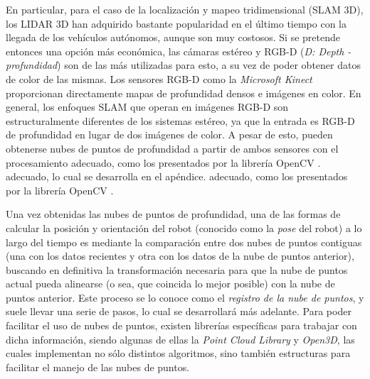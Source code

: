 \fi



En particular, para el caso de la localización y mapeo tridimensional (SLAM 3D), los LIDAR 3D han adquirido bastante popularidad en el último tiempo con la llegada de los vehículos autónomos, aunque son muy costosos. Si se pretende entonces una opción más económica, las cámaras estéreo y RGB-D (\textit{D: Depth - profundidad}) son de las más utilizadas para esto, a su vez de poder obtener datos de color de las mismas. Los sensores RGB-D como la \textit{Microsoft Kinect} proporcionan directamente mapas de profundidad densos e imágenes en color. En general, los enfoques SLAM que operan en imágenes RGB-D son estructuralmente diferentes de los sistemas estéreo, ya que la entrada es RGB-D de profundidad en lugar de dos imágenes de color. A pesar de esto, pueden obtenerse nubes de puntos de profundidad a partir de ambos sensores con el procesamiento
\ifimagenes
\ifimagenespaper
adecuado, como los presentados por la librería OpenCV \cite{kaehler2017}.
\else
adecuado, lo cual se desarrolla en el apéndice.
\fi
\else
adecuado, como los presentados por la librería OpenCV \cite{kaehler2017}.
\fi

Una vez obtenidas las nubes de puntos de profundidad, una de las formas de calcular la posición y orientación del robot (conocido como la \textit{pose} del robot) a lo largo del tiempo es mediante la comparación entre dos nubes de puntos contiguas (una con los datos recientes y otra con los datos de la nube de puntos anterior), buscando en definitiva la transformación necesaria para que la nube de puntos actual pueda alinearse (o sea, que coincida lo mejor posible) con la nube de puntos anterior. Este proceso se lo conoce como el \textit{registro de la nube de puntos}, y suele llevar una serie de pasos, lo cual se desarrollará más adelante. Para poder facilitar el uso de nubes de puntos, existen librerías específicas para trabajar con dicha información, siendo algunas de ellas la \textit{Point Cloud Library} y \textit{Open3D}, las cuales implementan no sólo distintos algoritmos, sino también estructuras para facilitar el manejo de las nubes de puntos.

